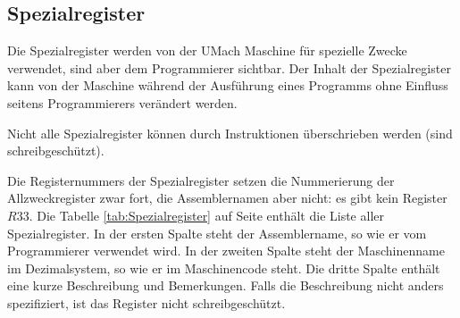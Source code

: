 \subsection{Spezialregister}
\label{subsec:Spezialregister}
Die Spezialregister werden von der UMach Maschine für spezielle Zwecke
verwendet, sind aber dem Programmierer sichtbar. Der Inhalt der Spezialregister
kann von der Maschine während der Ausführung eines Programms ohne Einfluss
seitens Programmierers verändert werden.

Nicht alle Spezialregister können durch Instruktionen überschrieben werden
(sind schreibgeschützt).

Die \glspl{Registernummer} der Spezialregister setzen die Nummerierung der
Allzweckregister zwar fort, die Assemblernamen aber nicht: es gibt kein Register
$R33$.
Die Tabelle \ref{tab:Spezialregister} auf Seite \pageref{tab:Spezialregister}
enthält die Liste aller Spezialregister. In der ersten
Spalte steht der Assemblername, so wie er vom Programmierer verwendet wird. In
der zweiten Spalte steht der Maschinenname im Dezimalsystem, so wie er im
Maschinencode steht.
Die dritte Spalte enthält eine kurze Beschreibung und Bemerkungen.
Falls die Beschreibung nicht anders spezifiziert, ist das Register nicht
schreibgeschützt.

